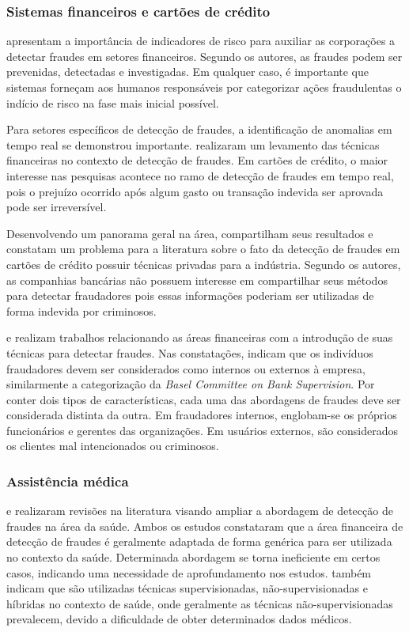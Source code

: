 \documentclass[smallextended]{svjour3}
\begin{document}
\subsubsection{Sistemas financeiros e cartões de crédito}

\cite{Gullkvist2013} apresentam a importância de indicadores de risco para auxiliar as corporações a detectar fraudes em setores financeiros. Segundo os autores, as fraudes podem ser prevenidas, detectadas e investigadas. Em qualquer caso, é importante que sistemas forneçam aos humanos responsáveis por categorizar ações fraudulentas o indício de risco na fase mais inicial possível.

Para setores específicos de detecção de fraudes, a identificação de anomalias em tempo real se demonstrou importante. \cite{Edge2009} realizaram um levamento das técnicas financeiras no contexto de detecção de fraudes. Em cartões de crédito, o maior interesse nas pesquisas acontece no ramo de detecção de fraudes em tempo real, pois o prejuízo ocorrido após algum gasto ou transação indevida ser aprovada pode ser irreversível.

Desenvolvendo um panorama geral na área, \cite{Allan2010} compartilham seus resultados e constatam um problema para a literatura sobre o fato da detecção de fraudes em cartões de crédito possuir técnicas privadas para a indústria. Segundo os autores, as companhias bancárias não possuem interesse em compartilhar seus métodos para detectar fraudadores pois essas informações poderiam ser utilizadas de forma indevida por criminosos.

\cite{Perlich2007} e \cite{Kanapickiene2015} realizam trabalhos relacionando as áreas financeiras com a introdução de suas técnicas para detectar fraudes. Nas constatações, indicam que os indivíduos fraudadores devem ser considerados como internos ou externos à empresa, similarmente a categorização da \emph{Basel Committee on Bank Supervision}. Por conter dois tipos de características, cada uma das abordagens de fraudes deve ser considerada distinta da outra. Em fraudadores internos, englobam-se os próprios funcionários e gerentes das organizações. Em usuários externos, são considerados os clientes mal intencionados ou criminosos.  

\subsubsection{Assistência médica}

\cite{Bauder2016} e \cite{Li2008} realizaram revisões na literatura visando ampliar a abordagem de detecção de fraudes na área da saúde. Ambos os estudos constataram que a área financeira de detecção de fraudes é geralmente adaptada de forma genérica para ser utilizada no contexto da saúde. Determinada abordagem se torna ineficiente em certos casos, indicando uma necessidade de aprofundamento nos estudos. \cite{Bauder2016} também indicam que são utilizadas técnicas supervisionadas, não-supervisionadas e híbridas no contexto de saúde, onde geralmente as técnicas não-supervisionadas prevalecem, devido a dificuldade de obter determinados dados médicos.
\end{document}
